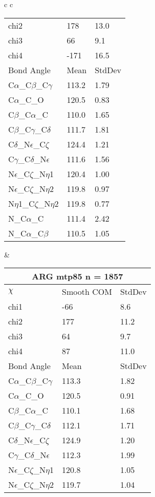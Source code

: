\begin{longtable}{ c c }
\begin{tabular}{ l l l }
  chi2 & 178 & 13.0 \\ 
  chi3 & 66 & 9.1 \\ 
  chi4 & -171 & 16.5 \\ \midrule
  Bond Angle   & Mean     & StdDev \\ \midrule
  C$\alpha$\_C$\beta$\_C$\gamma$ & 113.2 & 1.79\\
  C$\alpha$\_C\_O & 120.5 & 0.83\\
  C$\beta$\_C$\alpha$\_C & 110.0 & 1.65\\
  C$\beta$\_C$\gamma$\_C$\delta$ & 111.7 & 1.81\\
  C$\delta$\_N$\epsilon$\_C$\zeta$ & 124.4 & 1.21\\
  C$\gamma$\_C$\delta$\_N$\epsilon$ & 111.6 & 1.56\\
  N$\epsilon$\_C$\zeta$\_N$\eta$1 & 120.4 & 1.00\\
  N$\epsilon$\_C$\zeta$\_N$\eta$2 & 119.8 & 0.97\\
  N$\eta$1\_C$\zeta$\_N$\eta$2 & 119.8 & 0.77\\
  N\_C$\alpha$\_C & 111.4 & 2.42\\
  N\_C$\alpha$\_C$\beta$ & 110.5 & 1.05\\
  \bottomrule
  \end{tabular}
  &
  \begin{tabular}{ l l l }
  \toprule
  \multicolumn{3}{c}{ARG \textbf{mtp85} n = 1857} \\ \toprule
  $\chi$       & Smooth COM & StdDev \\ \midrule
  chi1 & -66 & 8.6 \\ 
  chi2 & 177 & 11.2 \\ 
  chi3 & 64 & 9.7 \\ 
  chi4 & 87 & 11.0 \\ \midrule
  Bond Angle   & Mean     & StdDev \\ \midrule
  C$\alpha$\_C$\beta$\_C$\gamma$ & 113.3 & 1.82\\
  C$\alpha$\_C\_O & 120.5 & 0.91\\
  C$\beta$\_C$\alpha$\_C & 110.1 & 1.68\\
  C$\beta$\_C$\gamma$\_C$\delta$ & 112.1 & 1.71\\
  C$\delta$\_N$\epsilon$\_C$\zeta$ & 124.9 & 1.20\\
  C$\gamma$\_C$\delta$\_N$\epsilon$ & 112.3 & 1.99\\
  N$\epsilon$\_C$\zeta$\_N$\eta$1 & 120.8 & 1.05\\
  N$\epsilon$\_C$\zeta$\_N$\eta$2 & 119.7 & 1.04\\

\end{tabular}
\end{longtable}
